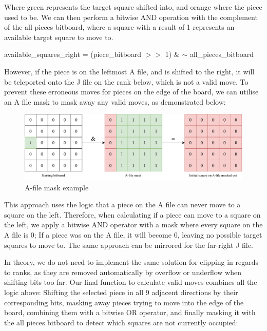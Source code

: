 \documentclass[../main/main.tex]{subfiles}
\begin{document}
Where green represents the target square shifted into, and orange where the piece used to be. We can then perform a bitwise AND operation with the complement of the all pieces bitboard, where a square with a result of 1 represents an available target square to move to.

\begin{center}
available\_squares\_right = (piece\_bitboard $>>$ 1) \& $\sim$ all\_pieces\_bitboard
\end{center}

However, if the piece is on the leftmost A file, and is shifted to the right, it will be teleported onto the J file on the rank below, which is not a valid move. To prevent these erroneous moves for pieces on the edge of the board, we can utilise an A file mask to mask away any valid moves, as demonstrated below:

\begin{figure}[H]
    \centering
    \includegraphics[width=\columnwidth]{../design/assets/bitboard_masked.pdf}
    \caption{A-file mask example}
    \label{fig:bitboard-masked}
\end{figure}

This approach uses the logic that a piece on the A file can never move to a square on the left. Therefore, when calculating if a piece can move to a square on the left, we apply a bitwise AND operator with a mask where every square on the A file is 0; If a piece was on the A file, it will become 0, leaving no possible target squares to move to. The same approach can be mirrored for the far-right J file.

In theory, we do not need to implement the same solution for clipping in regards to ranks, as they are removed automatically by overflow or underflow when shifting bits too far.
Our final function to calculate valid moves combines all the logic above: Shifting the selected piece in all 9 adjacent directions by their corresponding bits, masking away pieces trying to move into the edge of the board, combining them with a bitwise OR operator, and finally masking it with the all pieces bitboard to detect which squares are not currently occupied:
\end{document}
